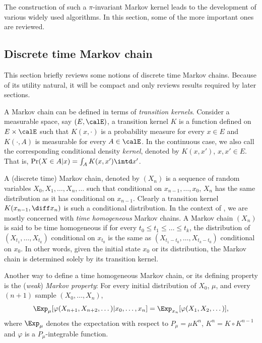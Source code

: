 The construction of such a $\pi$-invariant Markov kernel leads to the
development of various widely used \mcmc algorithms. In this section, some of
the more important ones are reviewed.

\subsection{Discrete time Markov chain}
\label{sub:Discrete time Markov chain}

This section briefly reviews some notions of discrete time Markov chains.
Because of its utility natural, it will be compact and only reviews results
required by later sections.

A Markov chain can be defined in terms of \emph{transition kernels}. Consider
a measurable space, say $(E,\calE)$, a transition kernel $K$ is a function defined
on $E\times\calE$ such that $K(x,\cdot)$ is a probability measure for every
$x\in E$ and $K(\cdot,A)$ is measurable for every $A\in\calE$. In the
continuous case, we also call the corresponding conditional density
\emph{kernel}, denoted by $K(x,x')$, $x,x'\in E$. That is, $\Pr(X\in A|x) =
\int_A K(x,x')\intd x'$.

A (discrete time) Markov chain, denoted by $(X_n)$ is a sequence of random
variables $X_0,X_1,\dots,X_n,\dots$ such that conditional on
$x_{n-1},\dots,x_0$, $X_n$ has the same distribution as it has conditional on
$x_{n-1}$. Clearly a transition kernel $K(x_{n-1},\diff x_n)$ is such a
conditional distribution. In the context of \mcmc, we are mostly concerned
with \emph{time homogeneous} Markov chains. A Markov chain $(X_n)$ is said to
be time homogeneous if for every $t_0\le t_1\le\dots\le t_k$, the distribution
of $(X_{t_1},\dots,X_{t_k})$ conditional on $x_{t_0}$ is the same as
$(X_{t_1-t_0},\dots,X_{t_k-t_0})$ conditional on $x_0$. In other words, given
the initial state $x_0$ or its distribution, the Markov chain is determined
solely by its transition kernel.

Another way to define a time homogeneous Markov chain, or its defining
property is the (\emph{weak}) \emph{Markov property}: For every initial
distribution of $X_0$, $\mu$, and every $(n+1)$ sample $(X_0,\dots,X_n)$,
\begin{equation}
  \Exp_{\mu}[\varphi(X_{n+1},X_{n+2},\dots)|x_0,\dots,x_n] =
  \Exp_{x_n}[\varphi(X_1,X_2,\dots)],
\end{equation}
where $\Exp_{\mu}$ denotes the expectation with respect to $P_{\mu} = \mu
K^n$, $K^n = K\vysmwhtcircle K^{n-1}$ and $\varphi$ is a $P_{\mu}$-integrable
function.

